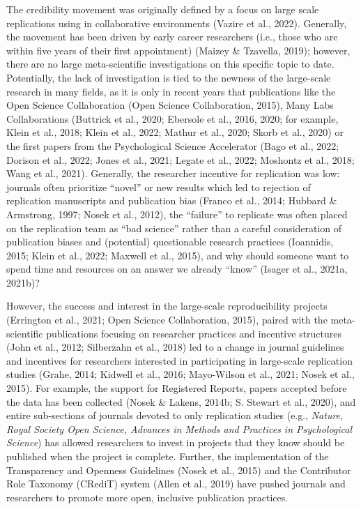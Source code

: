\documentclass[
  man]{apa7}
\begin{document}
The credibility movement was originally defined by a focus on large
scale replications using in collaborative environments (Vazire et al., 2022).
Generally, the movement has been driven by early career researchers
(i.e., those who are within five years of their first appointment)
(Maizey \& Tzavella, 2019); however, there are no large meta-scientific
investigations on this specific topic to date. Potentially, the lack of
investigation is tied to the newness of the large-scale research in many
fields, as it is only in recent years that publications like the Open
Science Collaboration (Open Science Collaboration, 2015), Many Labs
Collaborations (Buttrick et al., 2020; Ebersole et al., 2016, 2020; for example, Klein et al., 2018; Klein et al., 2022; Mathur et al., 2020; Skorb et al., 2020) or the first papers
from the Psychological Science Accelerator (Bago et al., 2022; Dorison et al., 2022; Jones et al., 2021; Legate et al., 2022; Moshontz et al., 2018; Wang et al., 2021). Generally, the
researcher incentive for replication was low: journals often prioritize
``novel'' or new results which led to rejection of replication manuscripts
and publication bias (Franco et al., 2014; Hubbard \& Armstrong, 1997; Nosek et al., 2012), the
``failure'' to replicate was often placed on the replication team as ``bad
science'' rather than a careful consideration of publication biases and
(potential) questionable research practices (Ioannidis, 2015; Klein et al., 2022; Maxwell et al., 2015), and why should someone want to spend time and
resources on an answer we already ``know'' (Isager et al., 2021a, 2021b)?

However, the success and interest in the large-scale reproducibility
projects (Errington et al., 2021; Open Science Collaboration, 2015), paired
with the meta-scientific publications focusing on researcher practices
and incentive structures (John et al., 2012; Silberzahn et al., 2018) led to a
change in journal guidelines and incentives for researchers interested
in participating in large-scale replication studies (Grahe, 2014; Kidwell et al., 2016; Mayo-Wilson et al., 2021; Nosek et al., 2015). For example, the support
for Registered Reports, papers accepted before the data has been
collected (Nosek \& Lakens, 2014b; S. Stewart et al., 2020), and entire sub-sections of
journals devoted to only replication studies (e.g., \emph{Nature, Royal
Society Open Science, Advances in Methods and Practices in Psychological
Science}) has allowed researchers to invest in projects that they know
should be published when the project is complete. Further, the
implementation of the Transparency and Openness Guidelines (Nosek et al., 2015)
and the Contributor Role Taxonomy (CRediT) system (Allen et al., 2019) have
pushed journals and researchers to promote more open, inclusive
publication practices.
\end{document}
